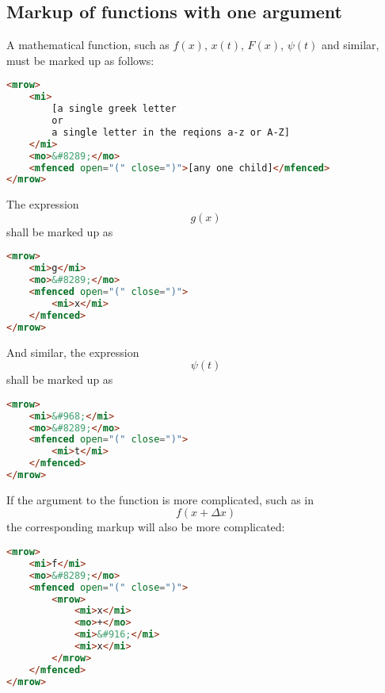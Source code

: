 \documentclass[english,a4paper,11pt]{article}
\begin{document}
\subsection{Markup of functions with one argument}
A mathematical function, such as $f(x)$, $x(t)$, $F(x)$, $\psi (t)$ and similar, must be marked up as follows:
\begin{lstlisting}[language=HTML]
<mrow>
	<mi>
		[a single greek letter 
		or 
		a single letter in the reqions a-z or A-Z]
	</mi>
	<mo>&#8289;</mo>
	<mfenced open="(" close=")">[any one child]</mfenced>
</mrow>
\end{lstlisting}


\begin{examples}
	The expression 
	\begin{equation}g(x)\end{equation}
	shall be marked up as
\begin{lstlisting}[language=HTML]
<mrow>
	<mi>g</mi>
	<mo>&#8289;</mo>
	<mfenced open="(" close=")">
		<mi>x</mi>
	</mfenced>
</mrow>
\end{lstlisting}

And similar, the expression 
\begin{equation}\psi(t)\end{equation}
shall be marked up as
\begin{lstlisting}[language=HTML]
<mrow>
	<mi>&#968;</mi>
	<mo>&#8289;</mo>
	<mfenced open="(" close=")">
		<mi>t</mi>
	</mfenced>
</mrow>
\end{lstlisting}

If the argument to the function is more complicated, such as in 
\begin{equation}f(x + \Delta x)\end{equation} 
the corresponding markup will also be more complicated:
\begin{lstlisting}[language=HTML]
<mrow>
	<mi>f</mi>
	<mo>&#8289;</mo>
	<mfenced open="(" close=")">
		<mrow>
			<mi>x</mi>
			<mo>+</mo>
			<mi>&#916;</mi>
			<mi>x</mi>
		</mrow>
	</mfenced>
</mrow>
\end{lstlisting}

\end{examples}
\end{document}
